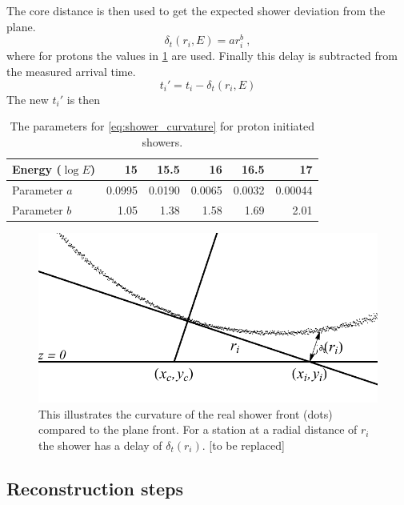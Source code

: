 The core distance is then used to get the expected shower deviation from the plane.
%
\begin{equation}\label{eq:shower_curvature}
    \delta_t(r_i, E) = a r_i^b \ ,
\end{equation}
%
where for protons the values in \cref{tab:curvature_parameters} are used. Finally this delay is subtracted from the measured arrival time.
%
\begin{equation}
    t_i' = t_i - \delta_t(r_i, E)
\end{equation}
%
The new $t_i'$ is then

\begin{table}
    \centering
    \begin{tabular}{@{}lrrrrr@{}}
        \toprule
        Energy ($\log E$) & 15     & 15.5   & 16     & 16.5   & 17      \\
        \midrule
        Parameter $a$     & 0.0995 & 0.0190 & 0.0065 & 0.0032 & 0.00044 \\
        Parameter $b$     & 1.05   & 1.38   & 1.58   & 1.69   & 2.01    \\
        \bottomrule
    \end{tabular}
    \caption{The parameters for \cref{eq:shower_curvature} for proton initiated showers.}
    \label{tab:curvature_parameters}
\end{table}

\begin{figure}
    \centering
    \includegraphics[width=0.7\linewidth]{plots/reconstructions/curvedfront.pdf}
    \caption{This illustrates the curvature of the real shower front (dots) compared to the plane front. For a station at a radial distance of $r_i$ the shower has a delay of $\delta_t(r_i)$. [to be replaced]}
    \label{fig:curved_front}
\end{figure}


\subsection{Reconstruction steps}


